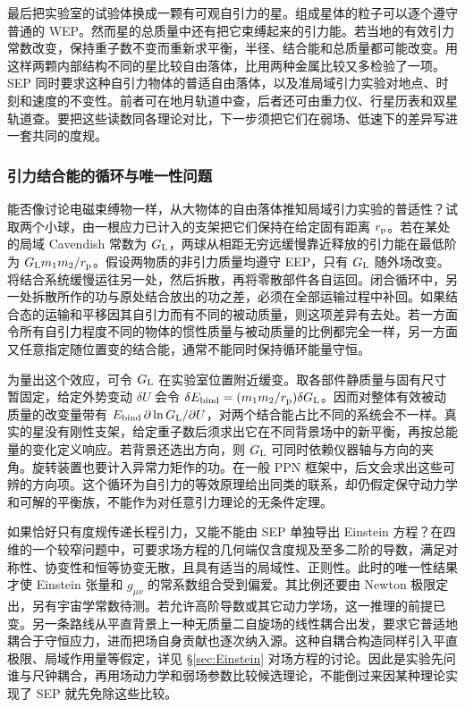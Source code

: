 最后把实验室的试验体换成一颗有可观自引力的星。组成星体的粒子可以逐个遵守普通的 WEP。然而星的总质量中还有把它束缚起来的引力能。若当地的有效引力常数改变，保持重子数不变而重新求平衡，半径、结合能和总质量都可能改变。用这样两颗内部结构不同的星比较自由落体，比用两种金属比较又多检验了一项。SEP 同时要求这种自引力物体的普适自由落体，以及准局域引力实验对地点、时刻和速度的不变性。前者可在地月轨道中查，后者还可由重力仪、行星历表和双星轨道查。要把这些读数同各理论对比，下一步须把它们在弱场、低速下的差异写进一套共同的度规。



\subsubsection{引力结合能的循环与唯一性问题}

能否像讨论电磁束缚物一样，从大物体的自由落体推知局域引力实验的普适性？试取两个小球，由一根应力已计入的支架把它们保持在给定固有距离 $r_{\rm p}$。若在某处的局域 Cavendish 常数为 $G_{\rm L}$，两球从相距无穷远缓慢靠近释放的引力能在最低阶为 $G_{\rm L}m_1m_2/r_{\rm p}$。假设两物质的非引力质量均遵守 EEP，只有 $G_{\rm L}$ 随外场改变。将结合系统缓慢运往另一处，然后拆散，再将零散部件各自运回。闭合循环中，另一处拆散所作的功与原处结合放出的功之差，必须在全部运输过程中补回。如果结合态的运输和平移因其自引力而有不同的被动质量，则这项差异有去处。若一方面令所有自引力程度不同的物体的惯性质量与被动质量的比例都完全一样，另一方面又任意指定随位置变的结合能，通常不能同时保持循环能量守恒。

为量出这个效应，可令 $G_{\rm L}$ 在实验室位置附近缓变。取各部件静质量与固有尺寸暂固定，给定外势变动 $\delta U$ 会令 $\delta E_{\rm bind}=(m_1m_2/r_{\rm p})\delta G_{\rm L}$。因而对整体有效被动质量的改变量带有 $E_{\rm bind}\,\partial\ln G_{\rm L}/\partial U$，对两个结合能占比不同的系统会不一样。真实的星没有刚性支架，给定重子数后须求出它在不同背景场中的新平衡，再按总能量的变化定义响应。若背景还选出方向，则 $G_{\rm L}$ 可同时依赖仪器轴与方向的夹角。旋转装置也要计入异常力矩作的功。在一般 PPN 框架中，后文会求出这些可辨的方向项。这个循环为自引力的等效原理给出同类的联系，却仍假定保守动力学和可解的平衡族，不能作为对任意引力理论的无条件定理。

如果恰好只有度规传递长程引力，又能不能由 SEP 单独导出 Einstein 方程？在四维的一个较窄问题中，可要求场方程的几何端仅含度规及至多二阶的导数，满足对称性、协变性和恒等协变无散，且具有适当的局域性、正则性。此时的唯一性结果才使 Einstein 张量和 $g_{\mu\nu}$ 的常系数组合受到偏爱。其比例还要由 Newton 极限定出，另有宇宙学常数待测。若允许高阶导数或其它动力学场，这一推理的前提已变。另一条路线从平直背景上一种无质量二自旋场的线性耦合出发，要求它普适地耦合于守恒应力，进而把场自身贡献也逐次纳入源。这种自耦合构造同样引入平直极限、局域作用量等假定，详见 \S\ref{sec:Einstein} 对场方程的讨论。因此是实验先问谁与尺钟耦合，再用场动力学和弱场参数比较候选理论，不能倒过来因某种理论实现了 SEP 就先免除这些比较。

